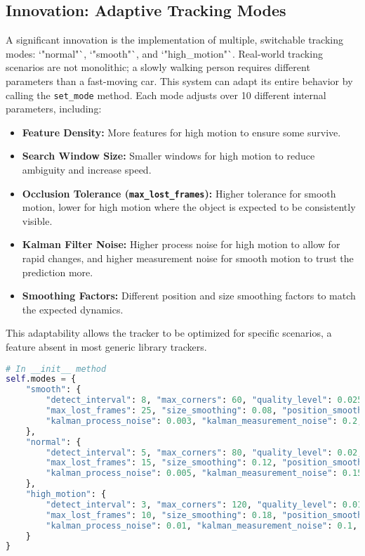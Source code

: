 \documentclass[12pt, a4paper]{article}
\begin{document}
\subsection{Innovation: Adaptive Tracking Modes}
A significant innovation is the implementation of multiple, switchable tracking modes: `"normal"`, `"smooth"`, and `"high\_motion"`. Real-world tracking scenarios are not monolithic; a slowly walking person requires different parameters than a fast-moving car. This system can adapt its entire behavior by calling the \texttt{set\_mode} method. Each mode adjusts over 10 different internal parameters, including:
\begin{itemize}
    \item \textbf{Feature Density:} More features for high motion to ensure some survive.
    \item \textbf{Search Window Size:} Smaller windows for high motion to reduce ambiguity and increase speed.
    \item \textbf{Occlusion Tolerance (\texttt{max\_lost\_frames}):} Higher tolerance for smooth motion, lower for high motion where the object is expected to be consistently visible.
    \item \textbf{Kalman Filter Noise:} Higher process noise for high motion to allow for rapid changes, and higher measurement noise for smooth motion to trust the prediction more.
    \item \textbf{Smoothing Factors:} Different position and size smoothing factors to match the expected dynamics.
\end{itemize}
This adaptability allows the tracker to be optimized for specific scenarios, a feature absent in most generic library trackers.

\begin{lstlisting}[language=Python, caption={Configuration dictionary for adaptive tracking modes.}, label={lst:modes}]
# In __init__ method
self.modes = {
    "smooth": {
        "detect_interval": 8, "max_corners": 60, "quality_level": 0.025,
        "max_lost_frames": 25, "size_smoothing": 0.08, "position_smoothing": 0.8,
        "kalman_process_noise": 0.003, "kalman_measurement_noise": 0.2, ...
    },
    "normal": {
        "detect_interval": 5, "max_corners": 80, "quality_level": 0.02,
        "max_lost_frames": 15, "size_smoothing": 0.12, "position_smoothing": 0.6,
        "kalman_process_noise": 0.005, "kalman_measurement_noise": 0.15, ...
    },
    "high_motion": {
        "detect_interval": 3, "max_corners": 120, "quality_level": 0.015,
        "max_lost_frames": 10, "size_smoothing": 0.18, "position_smoothing": 0.4,
        "kalman_process_noise": 0.01, "kalman_measurement_noise": 0.1, ...
    }
}
\end{lstlisting}
\end{document}
